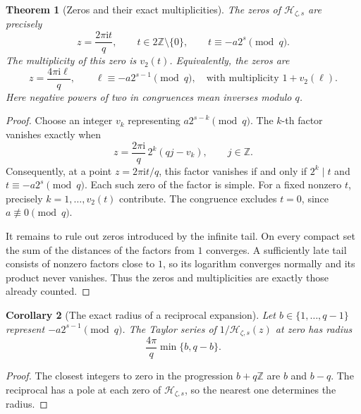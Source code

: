 \documentclass[11pt,a4paper,oneside,openany]{book}
\numberwithin{equation}{chapter}
\newtheorem{theorem}{Theorem}[chapter]
\newtheorem{corollary}[theorem]{Corollary}
\theoremstyle{definition}
\theoremstyle{remark}
\newcommand{\Z}{\mathbb Z}
\newcommand{\ii}{\mathrm i}
\newcommand{\Hp}{\mathcal H}
\begin{document}
\begin{theorem}[Zeros and their exact multiplicities]
\label{rr:thm:zeros}
The zeros of \(\Hp_{\zeta,s}\) are precisely
\begin{equation}
 z=\frac{2\pi\ii t}{q},\qquad
 t\in2\Z\setminus\{0\},\qquad
 t\equiv-a2^s\pmod q.
 \label{rr:eq:Hzeros}
\end{equation}
The multiplicity of this zero is \(v_2(t)\). Equivalently, the zeros are
\begin{equation}
 z=\frac{4\pi\ii\ell}{q},\qquad
 \ell\equiv-a2^{s-1}\pmod q,
 \quad\text{with multiplicity }1+v_2(\ell).
 \label{rr:eq:Hzerosell}
\end{equation}
Here negative powers of two in congruences mean inverses modulo \(q\).
\end{theorem}
\begin{proof}
Choose an integer \(v_k\) representing \(a2^{s-k}\pmod q\). The \(k\)-th factor vanishes exactly when
\[
 z=\frac{2\pi\ii}{q}\,2^k(qj-v_k),\qquad j\in\Z.
\]
Consequently, at a point \(z=2\pi\ii t/q\), this factor vanishes if and only if \(2^k\mid t\) and \(t\equiv-a2^s\pmod q\). Each such zero of the factor is simple. For a fixed nonzero \(t\), precisely \(k=1,\ldots,v_2(t)\) contribute. The congruence excludes \(t=0\), since \(a\not\equiv0\pmod q\).

It remains to rule out zeros introduced by the infinite tail. On every compact set the sum of the distances of the factors from \(1\) converges. A sufficiently late tail consists of nonzero factors close to \(1\), so its logarithm converges normally and its product never vanishes. Thus the zeros and multiplicities are exactly those already counted.
\end{proof}

\begin{corollary}[The exact radius of a reciprocal expansion]
Let \(b\in\{1,\ldots,q-1\}\) represent \(-a2^{s-1}\pmod q\). The Taylor series of \(1/\Hp_{\zeta,s}(z)\) at zero has radius
\begin{equation}
 \frac{4\pi}{q}\min\{b,q-b\}.
 \label{rr:eq:reciprocalradius}
\end{equation}
\end{corollary}
\begin{proof}
The closest integers to zero in the progression \(b+q\Z\) are \(b\) and \(b-q\). The reciprocal has a pole at each zero of \(\Hp_{\zeta,s}\), so the nearest one determines the radius.
\end{proof}
\end{document}
